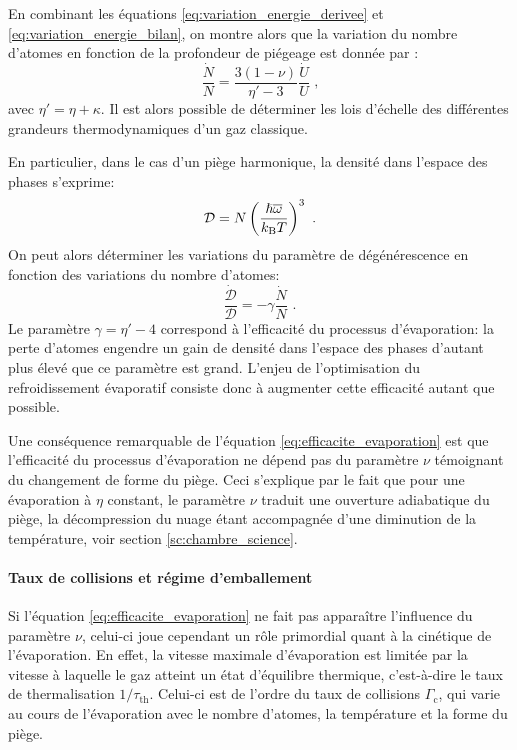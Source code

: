 En combinant les équations \ref{eq:variation_energie_derivee} et \ref{eq:variation_energie_bilan}, on montre alors que la variation du nombre d'atomes en fonction de la profondeur de piégeage est donnée par \citep{o2001scaling}:
\begin{equation}
\frac{\dot{N}}{N}={\frac{3(1-\nu)}{\eta'-3}} \frac{\dot{U}}{U} \text{ ,}
\label{eq:nombre_atome_evap}
\end{equation}
avec $\eta'=\eta+\kappa$. Il est alors possible de déterminer les lois d'échelle des différentes grandeurs thermodynamiques d'un gaz classique. 

En particulier, dans le cas d'un piège harmonique, la densité dans l'espace des phases s'exprime:
\begin{equation}
\mathcal{D}=N\left(\frac{\hslash \overline{\omega}}{k_{\mathrm{B}} T}\right)^3 \text{ .}
\end{equation}
On peut alors déterminer les variations du paramètre de dégénérescence en fonction des variations du nombre d'atomes: 
\begin{equation}
\frac{\dot{\mathcal{D}}}{\mathcal{D}} = -\gamma \frac{\dot{N}}{N} \text{ .}
\label{eq:efficacite_evaporation}
\end{equation}
Le paramètre $\gamma=\eta'-4$ correspond à l'efficacité du processus d'évaporation: la perte d'atomes engendre un gain de densité dans l'espace des phases d'autant plus élevé que ce paramètre est grand. L'enjeu de l'optimisation du refroidissement évaporatif consiste donc à augmenter cette efficacité autant que possible.

Une conséquence remarquable de l'équation \ref{eq:efficacite_evaporation} est que l'efficacité du processus d'évaporation ne dépend pas du paramètre $\nu$ témoignant du changement de forme du piège. Ceci s'explique par le fait que pour une évaporation à $\eta$ constant, le paramètre $\nu$ traduit une ouverture adiabatique du piège, la décompression du nuage étant accompagnée d'une diminution de la température, voir section \ref{sc:chambre_science}. 


\paragraph*{Taux de collisions et régime d'emballement}
Si l'équation \ref{eq:efficacite_evaporation} ne fait pas apparaître l'influence du paramètre $\nu$, celui-ci joue cependant un rôle primordial quant à la cinétique de l'évaporation. En effet, la vitesse maximale d'évaporation est limitée par la vitesse à laquelle le gaz atteint un état d'équilibre thermique, c'est-à-dire le taux de thermalisation $1/\tau_{\mathrm{th}}$. Celui-ci est de l'ordre du taux de collisions $\Gamma_{\mathrm{c}}$, qui varie au cours de l'évaporation avec le nombre d'atomes, la température et la forme du piège.%

